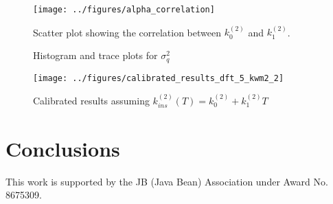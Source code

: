 \documentclass[article]{proc}
\begin{document}
\begin{figure}
    \centering
    \texttt{[image: ../figures/alpha\_correlation]}
    \caption{Scatter plot showing the correlation between $k^{(2)}_0$ and $k^{(2)}_1$.}
    \label{fig:alpha_correlation}
\end{figure}

\begin{figure}[b!]
    \centering
    \qquad
    \caption{Histogram and trace plots for $\sigma_q^2$}
    \label{fig:sigma_trace_2}
\end{figure}

\begin{figure}
    \centering
    \texttt{[image: ../figures/calibrated\_results\_dft\_5\_kwm2\_2]}
    \caption{Calibrated results assuming $k^{(2)}_{ins}(T) = k^{(2)}_0 + k^{(2)}_1 T$}
    \label{fig:cal_results_2}
\end{figure}


\section{Conclusions}



\acknowledgements

This work is supported by the JB (Java Bean) Association under Award No. 8675309.


\scriptsize{

}
\end{document}
